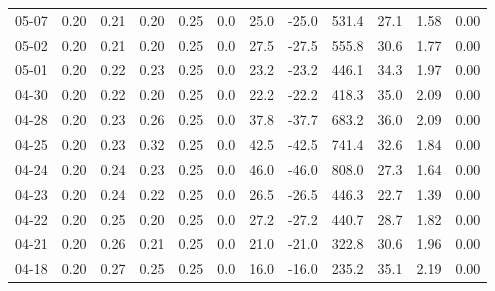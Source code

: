 \begin{threeparttable}
{\begin{tabular}{lrrrrrrrrrrr}
  05-07 &          0.20 &          0.21 &          0.20 &        0.25 &                 0.0 &                25.0 &      -25.0 &               531.4 &             27.1 &            1.58 &                   0.00 \\
  05-02 &          0.20 &          0.21 &          0.20 &        0.25 &                 0.0 &                27.5 &      -27.5 &               555.8 &             30.6 &            1.77 &                   0.00 \\
  05-01 &          0.20 &          0.22 &          0.23 &        0.25 &                 0.0 &                23.2 &      -23.2 &               446.1 &             34.3 &            1.97 &                   0.00 \\
  04-30 &          0.20 &          0.22 &          0.20 &        0.25 &                 0.0 &                22.2 &      -22.2 &               418.3 &             35.0 &            2.09 &                   0.00 \\
  04-28 &          0.20 &          0.23 &          0.26 &        0.25 &                 0.0 &                37.8 &      -37.7 &               683.2 &             36.0 &            2.09 &                   0.00 \\
  04-25 &          0.20 &          0.23 &          0.32 &        0.25 &                 0.0 &                42.5 &      -42.5 &               741.4 &             32.6 &            1.84 &                   0.00 \\
  04-24 &          0.20 &          0.24 &          0.23 &        0.25 &                 0.0 &                46.0 &      -46.0 &               808.0 &             27.3 &            1.64 &                   0.00 \\
  04-23 &          0.20 &          0.24 &          0.22 &        0.25 &                 0.0 &                26.5 &      -26.5 &               446.3 &             22.7 &            1.39 &                   0.00 \\
  04-22 &          0.20 &          0.25 &          0.20 &        0.25 &                 0.0 &                27.2 &      -27.2 &               440.7 &             28.7 &            1.82 &                   0.00 \\
  04-21 &          0.20 &          0.26 &          0.21 &        0.25 &                 0.0 &                21.0 &      -21.0 &               322.8 &             30.6 &            1.96 &                   0.00 \\
  04-18 &          0.20 &          0.27 &          0.25 &        0.25 &                 0.0 &                16.0 &      -16.0 &               235.2 &             35.1 &            2.19 &                   0.00 \\

\end{tabular}}
\end{threeparttable}
